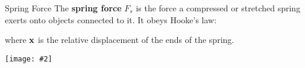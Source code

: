 \documentclass[12pt,compress,aspectratio=169]{beamer}
\newcommand{\pic}[2]{\texttt{[image: \#2]}}
\newcommand{\mb}[1]{\ensuremath\mathbf{#1}}
\newcommand{\eq}[2]{\vspace{#1}{\Large\begin{displaymath}#2\end{displaymath}}}
\begin{document}
\begin{frame}{Spring Force}
  The \textbf{spring force} $F_s$ is the force a compressed or stretched spring
  exerts onto objects connected to it. It obeys Hooke's law:
  
  \eq{-.2in}{
    \mb{F}_s=-k\mb{x}
  }
  where $\mb{x}$ is the relative displacement of the ends of the spring.
  \begin{center}
    \pic{.35}{graphics/spring-example1}
  \end{center}
\end{frame}





\end{document}
